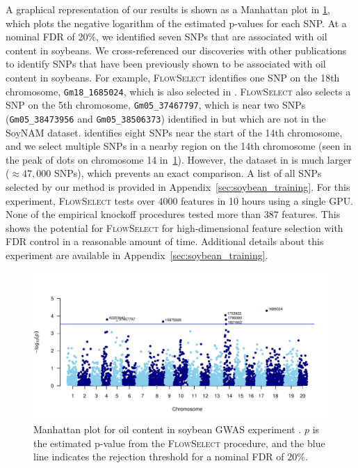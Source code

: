 \documentclass{article}
\newcommand{\FlowSelect}{\textsc{FlowSelect}\xspace}
\begin{document}
A graphical representation of our results is shown as a Manhattan plot in \cref{fig:manhattan-oil}, which plots the negative logarithm of the estimated p-values for each SNP.
At a nominal FDR of 20\%, we identified seven SNPs that are associated with oil content in soybeans.
We cross-referenced our discoveries with other publications to identify SNPs that have been previously shown to be associated with oil content in soybeans.
For example, \FlowSelect identifies one SNP on the 18th chromosome, \verb+Gm18_1685024+,  which is also selected in \citet{liu_phenotype_2019}.
\FlowSelect also selects a SNP on the 5th chromosome, \verb+Gm05_37467797+, which is near two SNPs (\verb+Gm05_38473956+ and \verb+Gm05_38506373+) identified in \citet{Cao2017} but which are not in the SoyNAM dataset.
\citet{Sonah2014} identifies eight SNPs near the start of the 14th chromosome, and we select multiple SNPs in a nearby region on the 14th chromosome (seen in the peak of dots on chromosome 14 in~\cref{fig:manhattan-oil}).
However, the dataset in \citet{Sonah2014} is much larger ($\approx47,000$ SNPs), which prevents an exact comparison.
A list of all SNPs selected by our method is provided in Appendix~\ref{sec:soybean_training}.
For this experiment, \FlowSelect tests over $4000$ features in 10 hours using a single GPU.
None of the empirical knockoff procedures \citep{sudarshanDeepDirectLikelihood2020, jordon2018knockoffgan, romanoDeepKnockoffs2018} tested more than $387$ features.
This shows the potential for \FlowSelect for high-dimensional feature selection with FDR control in a reasonable amount of time.
Additional details about this experiment are available in Appendix~\ref{sec:soybean_training}.

\begin{figure}
    \centering
    \includegraphics[width=1.0\linewidth]{fig/manhattan-oil.pdf}
    \caption{Manhattan plot for oil content in soybean GWAS experiment \citep{qqman}. $p$ is the estimated p-value from the \FlowSelect procedure, and the blue line indicates the rejection threshold for a nominal FDR of $20\%$.
    }
    \label{fig:manhattan-oil}
\end{figure}
\end{document}
